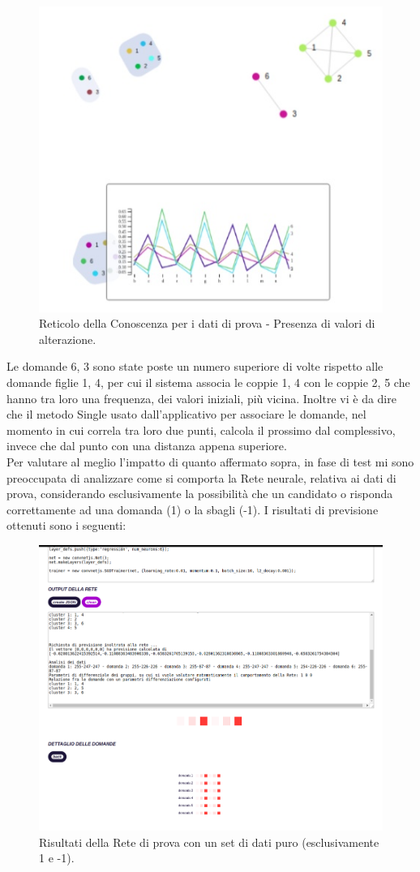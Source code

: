 \begin{figure}[H]
\centering
	\includegraphics[width=0.60\linewidth]{./image/collage_reticolo-general-PROBLEMA.png}
	\caption{Reticolo della Conoscenza per i dati di prova - Presenza di valori di alterazione.}
	\label{Reticolo della Conoscenza per i dati di prova - Presenza di valori di alterazione.}
\end{figure}
\noindent
Le domande 6, 3 sono state poste un numero superiore di volte rispetto alle domande figlie 1, 4, per cui il sistema associa le coppie 1, 4 con le coppie 2, 5 che hanno tra loro una frequenza, dei valori iniziali, pi\`u vicina. Inoltre vi \`e da dire che il metodo Single usato dall'applicativo per associare le domande, nel momento in cui correla tra loro due punti, calcola il prossimo dal complessivo, invece che dal punto con una distanza appena superiore.\\
Per valutare al meglio l'impatto di quanto affermato sopra, in fase di test mi sono preoccupata di analizzare come si comporta la Rete neurale, relativa ai dati di prova, considerando esclusivamente la possibilit\`a che un candidato o risponda correttamente ad una domanda (1) o la sbagli (-1). I risultati di previsione ottenuti sono i seguenti:
\begin{figure}[H]
\centering
	\includegraphics[width=1\linewidth]{./image/RetediProva_generatorinputpuro.png}
	\caption{Risultati della Rete di prova con un set di dati puro (esclusivamente 1 e -1).}
	\label{Risultati della Rete di prova con un set di dati puro (esclusivamente 1 e -1).}
	\end{figure}
